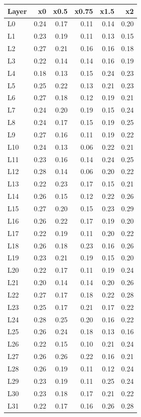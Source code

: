 {\scriptsize\begin{longtable}{@{}lrrrrr@{}}
\toprule Layer & x0 & x0.5 & x0.75 & x1.5 & x2 \\ \midrule \endhead
\bottomrule \endfoot
L0 & 0.24 & 0.17 & 0.11 & 0.14 & 0.20 \\
L1 & 0.23 & 0.19 & 0.11 & 0.13 & 0.15 \\
L2 & 0.27 & 0.21 & 0.16 & 0.16 & 0.18 \\
L3 & 0.22 & 0.14 & 0.14 & 0.16 & 0.19 \\
L4 & 0.18 & 0.13 & 0.15 & 0.24 & 0.23 \\
L5 & 0.25 & 0.22 & 0.13 & 0.21 & 0.23 \\
L6 & 0.27 & 0.18 & 0.12 & 0.19 & 0.21 \\
L7 & 0.24 & 0.20 & 0.19 & 0.15 & 0.24 \\
L8 & 0.24 & 0.17 & 0.15 & 0.19 & 0.25 \\
L9 & 0.27 & 0.16 & 0.11 & 0.19 & 0.22 \\
L10 & 0.24 & 0.13 & 0.06 & 0.22 & 0.21 \\
L11 & 0.23 & 0.16 & 0.14 & 0.24 & 0.25 \\
L12 & 0.28 & 0.14 & 0.06 & 0.20 & 0.22 \\
L13 & 0.22 & 0.23 & 0.17 & 0.15 & 0.21 \\
L14 & 0.26 & 0.15 & 0.12 & 0.22 & 0.26 \\
L15 & 0.27 & 0.20 & 0.15 & 0.23 & 0.29 \\
L16 & 0.26 & 0.22 & 0.17 & 0.19 & 0.20 \\
L17 & 0.22 & 0.19 & 0.11 & 0.20 & 0.22 \\
L18 & 0.26 & 0.18 & 0.23 & 0.16 & 0.26 \\
L19 & 0.23 & 0.21 & 0.19 & 0.15 & 0.20 \\
L20 & 0.22 & 0.17 & 0.11 & 0.19 & 0.24 \\
L21 & 0.20 & 0.14 & 0.14 & 0.20 & 0.26 \\
L22 & 0.27 & 0.17 & 0.18 & 0.22 & 0.28 \\
L23 & 0.25 & 0.17 & 0.21 & 0.17 & 0.22 \\
L24 & 0.28 & 0.25 & 0.20 & 0.16 & 0.22 \\
L25 & 0.26 & 0.24 & 0.18 & 0.13 & 0.16 \\
L26 & 0.22 & 0.15 & 0.10 & 0.21 & 0.24 \\
L27 & 0.26 & 0.26 & 0.22 & 0.16 & 0.21 \\
L28 & 0.26 & 0.19 & 0.11 & 0.12 & 0.24 \\
L29 & 0.23 & 0.19 & 0.11 & 0.25 & 0.24 \\
L30 & 0.23 & 0.18 & 0.17 & 0.21 & 0.22 \\
L31 & 0.22 & 0.17 & 0.16 & 0.26 & 0.28 \\
\end{longtable}}
